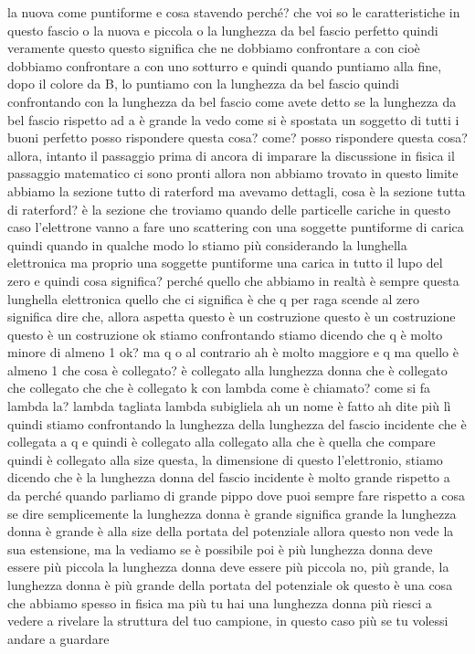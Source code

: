 \begin{soluzione}
   la nuova come puntiforme e cosa stavendo perché? che voi so le caratteristiche in questo fascio o la nuova e piccola o la lunghezza da bel fascio perfetto quindi veramente questo questo significa che ne dobbiamo confrontare a con cioè dobbiamo confrontare a con uno sotturro e quindi quando puntiamo alla fine, dopo il colore da B, lo puntiamo con la lunghezza da bel fascio quindi confrontando con la lunghezza da bel fascio come avete detto se la lunghezza da bel fascio rispetto ad a è grande la vedo come si è spostata un soggetto di tutti i buoni perfetto posso rispondere questa cosa? come? posso rispondere questa cosa? allora, intanto il passaggio prima di ancora di imparare la discussione in fisica il passaggio matematico ci sono pronti allora non abbiamo trovato in questo limite abbiamo la sezione tutto di raterford ma avevamo dettagli, cosa è la sezione tutta di raterford? è la sezione che troviamo quando delle particelle cariche in questo caso l'elettrone vanno a fare uno scattering con una soggette puntiforme di carica quindi quando in qualche modo lo stiamo più considerando la lunghella elettronica ma proprio una soggette puntiforme una carica in tutto il lupo del zero e quindi cosa significa? perché quello che abbiamo in realtà è sempre questa lunghella elettronica quello che ci significa è che q per raga scende al zero significa dire che, allora aspetta questo è un costruzione questo è un costruzione questo è un costruzione ok stiamo confrontando stiamo dicendo che q è molto minore di almeno 1 ok? ma q o al contrario ah è molto maggiore e q ma quello è almeno 1 che cosa è collegato? è collegato alla lunghezza donna che è collegato che collegato che che è collegato k con lambda come è chiamato? come si fa lambda la? lambda tagliata lambda subigliela ah un nome è fatto ah dite più lì quindi stiamo confrontando la lunghezza della lunghezza del fascio incidente che è collegata a q e quindi è collegato alla collegato alla che è quella che compare quindi è collegato alla size questa, la dimensione di questo l'elettronio, stiamo dicendo che è la lunghezza donna del fascio incidente è molto grande rispetto a da perché quando parliamo di grande pippo dove puoi sempre fare rispetto a cosa se dire semplicemente la lunghezza donna è grande significa grande la lunghezza donna è grande è alla size della portata del potenziale allora questo non vede la sua estensione, ma la vediamo se è possibile poi è più lunghezza donna deve essere più piccola la lunghezza donna deve essere più piccola no, più grande, la lunghezza donna è più grande della portata del potenziale ok questo è una cosa che abbiamo spesso in fisica ma più tu hai una lunghezza donna più riesci a vedere a rivelare la struttura del tuo campione, in questo caso più se tu volessi andare a guardare 
   

\end{soluzione}
